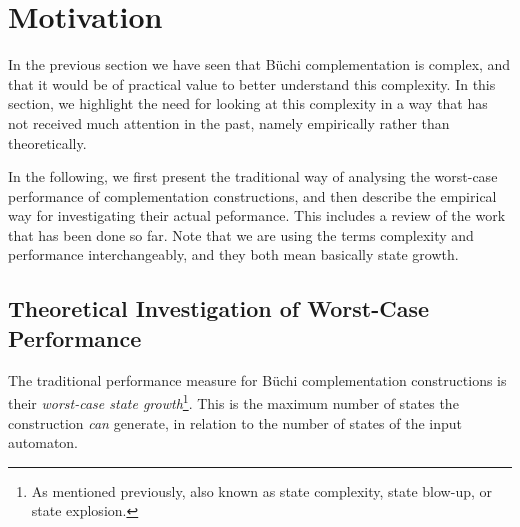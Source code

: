 

\section{Motivation}
In the previous section we have seen that Büchi complementation is complex, and that it would be of practical value to better understand this complexity. In this section, we highlight the need for looking at this complexity in a way that has not received much attention in the past, namely empirically rather than theoretically.

In the following, we first present the traditional way of analysing the worst-case performance of complementation constructions, and then describe the empirical way for investigating their actual peformance. This includes a review of the work that has been done so far. Note that we are using the terms complexity and performance interchangeably, and they both mean basically state growth.

\subsection{Theoretical Investigation of Worst-Case Performance}
The traditional performance measure for Büchi complementation constructions is their \textit{worst-case state growth}\footnote{As mentioned previously, also known as state complexity, state blow-up, or state explosion.}. This is the maximum number of states the construction \textit{can} generate, in relation to the number of states of the input automaton.

